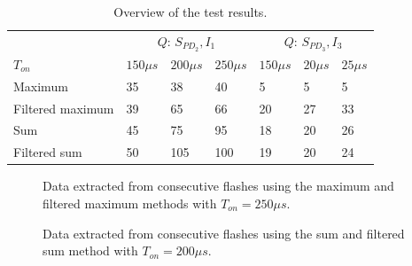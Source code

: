 \begin{table}[]
	\centering
\begin{tabular}{l|lll|lll|}
	& \multicolumn{3}{c|}{$Q$: $S_{PD_2}, I_1$} & \multicolumn{3}{c|}{$Q$: $S_{PD_3}, I_3$} \\
	$T_{on}$         & $150 \mu s$ & $200\mu s$ & $250\mu s$ & $150\mu s$  & $20\mu s$  & $25\mu s$  \\ \hline
	Maximum          & 35          & 38         & 40         & 5           & 5          & 5          \\
	Filtered maximum & 39          & 65         & 66         & 20          & 27         & 33         \\
	Sum              & 45          & 75         & 95         & 18          & 20         & 26         \\
	Filtered sum     & 50          & 105        & 100        & 19          & 20         & 24        
\end{tabular}
	\caption{Overview of the test results.\label{SNR_results}}
\end{table}


\begin{figure}
	\centering     %
	\caption{Data extracted from consecutive flashes using the maximum and filtered maximum methods with $T_{on} = 250\mu s$.\label{fig:SimpleFeatures}}
\end{figure}

\begin{figure}
	\centering     %
	\caption{Data extracted from consecutive flashes using the sum and filtered sum method with $T_{on} = 200\mu s$.\label{fig:complexFeatures}}
\end{figure}

